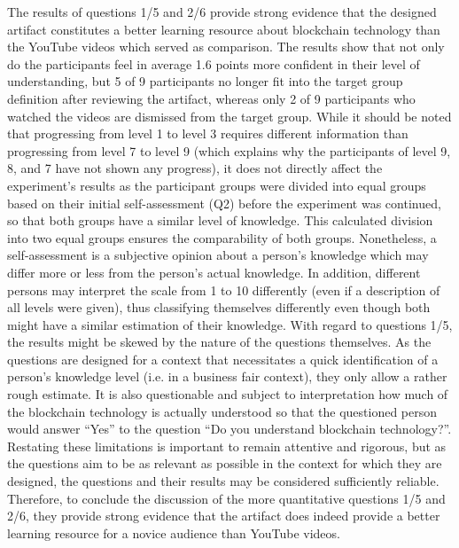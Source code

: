 The results of questions 1/5 and 2/6 provide strong evidence that the designed artifact constitutes a better learning resource about blockchain technology than the YouTube videos which served as comparison. The results show that not only do the participants feel in average 1.6 points more confident in their level of understanding, but 5 of 9 participants no longer fit into the target group definition after reviewing the artifact, whereas only 2 of 9 participants who watched the videos are dismissed from the target group. While it should be noted that progressing from level 1 to level 3 requires different information than progressing from level 7 to level 9 (which explains why the participants of level 9, 8, and 7 have not shown any progress), it does not directly affect the experiment's results as the participant groups were divided into equal groups based on their initial self-assessment (Q2) before the experiment was continued, so that both groups have a similar level of knowledge. This calculated division into two equal groups ensures the comparability of both groups. Nonetheless, a self-assessment is a subjective opinion about a person's knowledge which may differ more or less from the person's actual knowledge. In addition, different persons may interpret the scale from 1 to 10 differently (even if a description of all levels were given), thus classifying themselves differently even though both might have a similar estimation of their knowledge. With regard to questions 1/5, the results might be skewed by the nature of the questions themselves. As the questions are designed for a context that necessitates a quick identification of a person's knowledge level (i.e. in a business fair context), they only allow a rather rough estimate. It is also questionable and subject to interpretation how much of the blockchain technology is actually understood so that the questioned person would answer \enquote{Yes} to the question \enquote{Do you understand blockchain technology?}. Restating these limitations is important to remain attentive and rigorous, but as the questions aim to be as relevant as possible in the context for which they are designed, the questions and their results may be considered sufficiently reliable. Therefore, to conclude the discussion of the more quantitative questions 1/5 and 2/6, they provide strong evidence that the artifact does indeed provide a better learning resource for a novice audience than YouTube videos.

